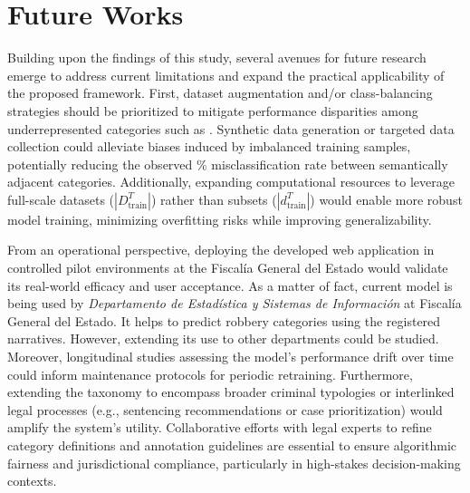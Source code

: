 \documentclass[onecolumn, journal, english, 12pt, a4paper]{IEEEtran} %
\theoremstyle{definition}
\begin{document}
\section{Future Works}\label{chap:futuro}




Building upon the findings of this study, several avenues for future
research emerge to address current limitations and expand the
practical applicability of the proposed framework. First, dataset
augmentation and/or class-balancing strategies should be prioritized to
mitigate performance disparities among underrepresented categories
such as . Synthetic data
generation or targeted data collection could alleviate biases induced
by imbalanced training samples, potentially reducing the observed
\% misclassification rate between semantically adjacent
categories. Additionally, expanding computational resources to
leverage full-scale datasets ($|D_{\text{train}}^T|$) rather than
subsets ($|d_{\text{train}}^T|$) would enable more robust model
training, minimizing overfitting risks while improving
generalizability.

From an operational perspective, deploying the developed web
application in controlled pilot environments at the Fiscalía General
del Estado would validate its real-world efficacy and user
acceptance. As a matter of fact, current model is being used by
\textit{Departamento de Estadística y Sistemas de Información} at
Fiscalía General del Estado. It helps to predict robbery categories
using the registered narratives. However, extending its use to other
departments could be studied. Moreover, longitudinal studies assessing the
model’s performance drift over time could inform maintenance protocols
for periodic retraining. Furthermore, extending the taxonomy to
encompass broader criminal typologies or interlinked legal processes
(e.g., sentencing recommendations or case prioritization) would
amplify the system’s utility. Collaborative efforts with legal experts
to refine category definitions and annotation guidelines are essential
to ensure algorithmic fairness and jurisdictional compliance,
particularly in high-stakes decision-making contexts.
\end{document}

